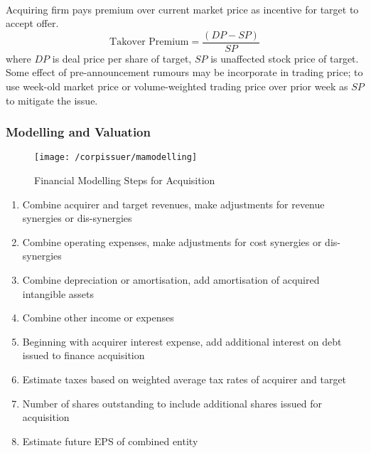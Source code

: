 \begin{method} \\
Acquiring firm pays premium over current market price as incentive for target to accept offer.
\begin{equation}
\text{Takover Premium} = \frac{(DP - SP)}{SP} \nonumber
\end{equation}
where $DP$ is deal price per share of target, $SP$ is unaffected stock price of target.\\
Some effect of pre-announcement rumours may be incorporate in trading price; to use week-old market price or volume-weighted trading price over prior week as $SP$ to mitigate the issue.
\end{method}

\subsubsection{Modelling and Valuation}

\begin{figure}[H]
\centering
\texttt{[image: /corpissuer/mamodelling]}
\caption{Financial Modelling Steps for Acquisition}
\end{figure}

\begin{method} 
\begin{enumerate}[label=\arabic*.]
\setlength{\itemsep}{0pt}
\item Combine acquirer and target revenues, make adjustments for revenue synergies or dis-synergies
\item Combine operating expenses, make adjustments for cost synergies or dis-synergies
\item Combine depreciation or amortisation, add amortisation of acquired intangible assets
\item Combine other income or expenses
\item Beginning with acquirer interest expense, add additional interest on debt issued to finance acquisition
\item Estimate taxes based on weighted average tax rates of acquirer and target
\item Number of shares outstanding to include additional shares issued for acquisition
\item Estimate future EPS of combined entity
\end{enumerate}
\end{method}

